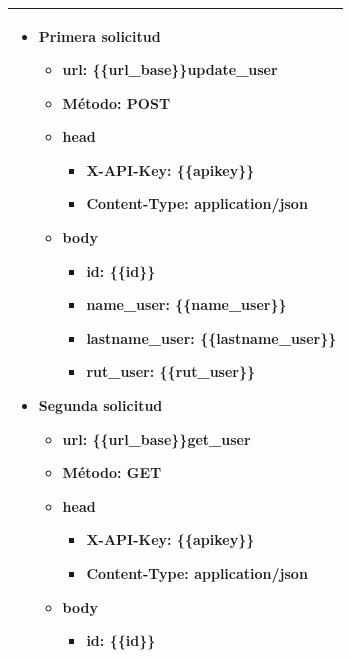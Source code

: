 \begin{table}[H]
\begin{tabular}{|p{}|}
		\begin{itemize}
			\item Primera solicitud
			\begin{itemize}
				\item url: \{\{url\_base\}\}update\_user
				\item Método: POST
				\item head
				\begin{itemize}
					\item X-API-Key: \{\{apikey\}\}
					\item Content-Type: application/json
				\end{itemize}
				\item body
				\begin{itemize}
					\item id: \{\{id\}\}
					\item name\_user: \{\{name\_user\}\}
					\item lastname\_user: \{\{lastname\_user\}\}
					\item rut\_user: \{\{rut\_user\}\}
				\end{itemize}
			\end{itemize}
			\item Segunda solicitud
			\begin{itemize}
				\item url: \{\{url\_base\}\}get\_user
				\item Método: GET
				\item head
				\begin{itemize}
					\item X-API-Key: \{\{apikey\}\}
					\item Content-Type: application/json
				\end{itemize}
				\item body
				\begin{itemize}
					\item id: \{\{id\}\}
				\end{itemize}
			\end{itemize}
		\end{itemize} \\ \hline
    \end{tabular}
\end{table}

